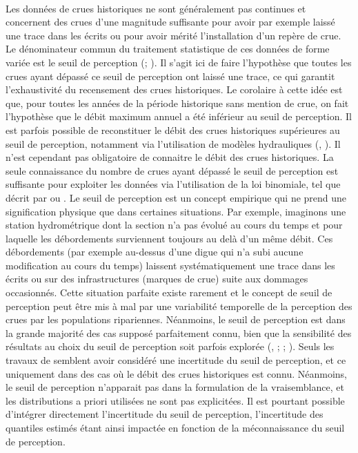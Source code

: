 	\paragraph{} Les données de crues historiques ne sont généralement pas continues et concernent des crues d'une magnitude suffisante pour avoir par exemple laissé une trace dans les écrits ou pour avoir mérité l'installation d'un repère de crue. Le dénominateur commun du traitement statistique de ces données de forme variée est le seuil de perception (\citet{gerard_probability_1979}; \citet{stedinger_flood_1986}). Il s'agit ici de faire l'hypothèse que toutes les crues ayant dépassé ce seuil de perception ont laissé une trace, ce qui garantit l'exhaustivité du recensement des crues historiques. Le corolaire à cette idée est que, pour toutes les années de la période historique sans mention de crue, on fait l'hypothèse que le débit maximum annuel a été inférieur au seuil de perception. Il est parfois possible de reconstituer le débit des crues historiques supérieures au seuil de perception, notamment via l'utilisation de modèles hydrauliques (\citet{neppel_flood_2010}, \citet{machado_flood_2015}). Il n'est cependant pas obligatoire de connaitre le débit des crues historiques. La seule connaissance du nombre de crues ayant dépassé le seuil de perception est suffisante pour exploiter les données via l'utilisation de la loi binomiale, tel que décrit par \citet{stedinger_flood_1986} ou \citet{payrastre_usefulness_2011}. Le seuil de perception est un concept empirique qui ne prend une signification physique que dans certaines situations. Par exemple, imaginons une station hydrométrique dont la section n'a pas évolué au cours du temps et pour laquelle les débordements surviennent toujours au delà d'un même débit. Ces débordements (par exemple au-dessus d'une digue qui n'a subi aucune modification au cours du temps) laissent systématiquement une trace dans les écrits ou sur des infrastructures (marques de crue) suite aux dommages occasionnés. Cette situation parfaite existe rarement et le concept de seuil de perception peut être mis à mal par une variabilité temporelle de la perception des crues par les populations ripariennes. Néanmoins, le seuil de perception est dans la grande majorité des cas supposé parfaitement connu, bien que la sensibilité des résultats au choix du seuil de perception soit parfois explorée (\citet{stedinger_flood_1986}, \citet{viglione_flood_2013}; \citet{macdonald_reassessing_2014}; \citet{payrastre_usefulness_2011}). Seuls les travaux de \citet{parkes_defining_2016} semblent avoir considéré une incertitude du seuil de perception, et ce uniquement dans des cas où le débit des crues historiques est connu. Néanmoins, le seuil de perception n'apparait pas dans la formulation de la vraisemblance, et les distributions a priori utilisées ne sont pas explicitées. Il est pourtant possible d'intégrer directement l'incertitude du seuil de perception, l'incertitude des quantiles estimés étant ainsi impactée en fonction de la méconnaissance du seuil de perception. 

